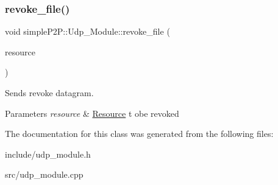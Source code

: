 \subsubsection{\texorpdfstring{revoke\+\_\+file()}{revoke\_file()}}
{\footnotesize\ttfamily void simple\+P2\+P\+::\+Udp\+\_\+\+Module\+::revoke\+\_\+file (\begin{DoxyParamCaption}\item[{const \hyperlink{classsimpleP2P_1_1Resource}{Resource} \&}]{resource }\end{DoxyParamCaption})}



Sends revoke datagram. 


\begin{DoxyParams}{Parameters}
{\em resource} & \hyperlink{classsimpleP2P_1_1Resource}{Resource} t obe revoked \\
\hline
\end{DoxyParams}


The documentation for this class was generated from the following files\+:\begin{DoxyCompactItemize}
\item 
include/udp\+\_\+module.\+h\item 
src/udp\+\_\+module.\+cpp\end{DoxyCompactItemize}

